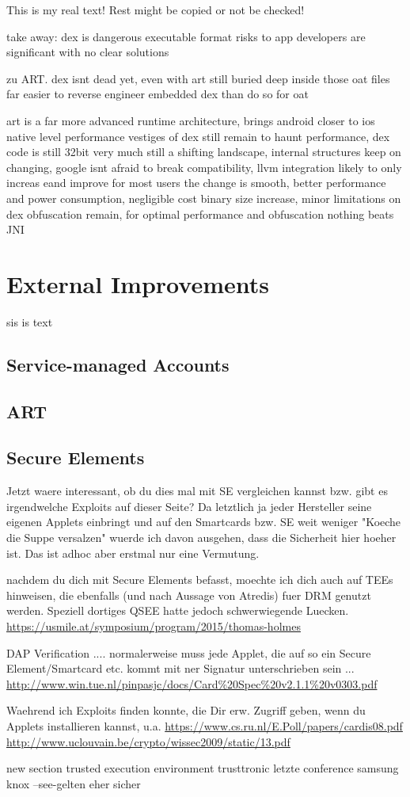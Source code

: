 This is my real text! Rest might be copied or not be checked!

%
take away:
dex is dangerous executable format
risks to app developers are significant with no clear solutions

zu ART.
dex isnt dead yet, even with art
still buried deep inside those oat files
far easier to reverse engineer embedded dex than do so for oat

art is a far more advanced runtime architecture, brings android closer to ios native level performance
vestiges of dex still remain to haunt performance, dex code is still 32bit
very much still a shifting landscape, internal structures keep on changing, google isnt afraid to break compatibility, llvm integration likely to only increas eand improve
for most users the change is smooth, better performance and power consumption, negligible cost binary size increase, minor limitations on dex obfuscation remain, for optimal performance and obfuscation nothing beats JNI
\cite{andevconDalvikART}
%
\section{External Improvements} \label{section:evaluation-setion}
sis is text
\subsection{Service-managed Accounts}
\subsection{ART}
\subsection{Secure Elements}
Jetzt waere interessant, ob du dies mal mit SE vergleichen kannst bzw. gibt es irgendwelche Exploits auf dieser Seite? Da letztlich ja jeder Hersteller seine eigenen Applets einbringt und auf den Smartcards bzw. SE weit weniger "Koeche die Suppe versalzen" wuerde ich davon ausgehen, dass die Sicherheit hier hoeher ist. Das ist adhoc aber erstmal nur eine Vermutung.



nachdem du dich mit Secure Elements befasst, moechte ich dich auch auf TEEs hinweisen, die ebenfalls (und nach Aussage von Atredis) fuer DRM genutzt werden. Speziell dortiges QSEE hatte jedoch schwerwiegende Luecken.
\url{https://usmile.at/symposium/program/2015/thomas-holmes​}

DAP Verification .... normalerweise muss jede Applet, die auf so ein Secure Element/Smartcard etc. kommt mit ner Signatur unterschrieben sein ...
\url{http://www.win.tue.nl/pinpasjc/docs/Card%20Spec%20v2.1.1%20v0303.pdf}


Waehrend ich Exploits finden konnte, die Dir erw. Zugriff geben, wenn du Applets installieren kannst, u.a.
\url{https://www.cs.ru.nl/E.Poll/papers/cardis08.pdf}
\url{http://www.uclouvain.be/crypto/wissec2009/static/13.pdf}​



new section trusted execution environment
trusttronic letzte conference
samsung knox
--see-gelten eher sicher

